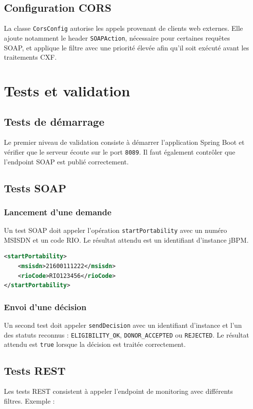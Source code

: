 \documentclass[12pt,a4paper]{report}
\begin{document}
\section{Configuration CORS}
La classe \texttt{CorsConfig} autorise les appels provenant de clients web externes. Elle ajoute notamment le header \texttt{SOAPAction}, nécessaire pour certaines requêtes SOAP, et applique le filtre avec une priorité élevée afin qu'il soit exécuté avant les traitements CXF.

\chapter{Tests et validation}
\section{Tests de démarrage}
Le premier niveau de validation consiste à démarrer l'application Spring Boot et vérifier que le serveur écoute sur le port \texttt{8089}. Il faut également contrôler que l'endpoint SOAP est publié correctement.

\section{Tests SOAP}
\subsection{Lancement d'une demande}
Un test SOAP doit appeler l'opération \texttt{startPortability} avec un numéro MSISDN et un code RIO. Le résultat attendu est un identifiant d'instance jBPM.

\begin{lstlisting}[language=XML,caption={Exemple conceptuel de requête SOAP}]
<startPortability>
    <msisdn>21600111222</msisdn>
    <rioCode>RIO123456</rioCode>
</startPortability>
\end{lstlisting}

\subsection{Envoi d'une décision}
Un second test doit appeler \texttt{sendDecision} avec un identifiant d'instance et l'un des statuts reconnus : \texttt{ELIGIBILITY\_OK}, \texttt{DONOR\_ACCEPTED} ou \texttt{REJECTED}. Le résultat attendu est \texttt{true} lorsque la décision est traitée correctement.

\section{Tests REST}
Les tests REST consistent à appeler l'endpoint de monitoring avec différents filtres. Exemple :
\end{document}
